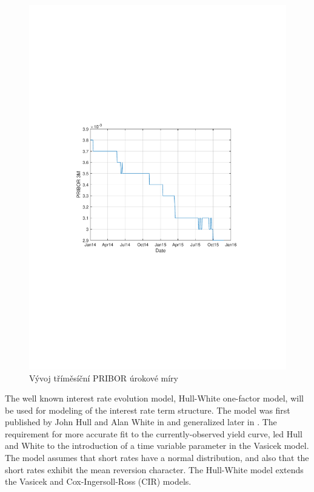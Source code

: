 \documentclass[a4paper,12pt]{report}
\theoremstyle{definition} \newtheorem{definice}[veta]{Definice}
\theoremstyle{remark}
\begin{document}
\begin{figure}[!htbp]
  \centering 
	\includegraphics[width=13cm, clip, trim= 110 280 110 270]{IMG/PRIBOR.pdf}
  \caption{Vývoj tříměsíční PRIBOR úrokové míry}  \label{PRIBOR}
\end{figure}

The well known interest rate evolution model, Hull-White one-factor model, will be used for modeling of the interest rate term structure. 
The model was first published by John Hull and Alan White in \cite{hull1990pricing} and generalized later in \cite{hull2001general}.
The requirement for more accurate fit to the currently-observed yield curve, led Hull and White to the introduction of a time variable parameter in the Vasicek model. 
The model assumes that short rates have a normal distribution, and also that the short rates exhibit the mean reversion character. 
The Hull-White model extends the Vasicek and Cox-Ingersoll-Ross (CIR) models.
\end{document}
